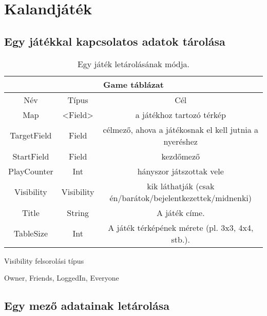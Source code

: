 \section{Kalandjáték}

\subsection{Egy játékkal kapcsolatos adatok tárolása}

\begin{table}[H]
	\centering
	\begin{tabular}{ |c|c|c| }
		\hline
		\multicolumn{3}{|c|}{Game táblázat}\\
		\hline
		Név & Típus & Cél \\
		\hline
		Map  & <Field>  & a játékhoz tartozó térkép  \\
		\hline
		TargetField & Field & célmező, ahova a játékosnak el kell jutnia a nyeréshez\\
		\hline
		StartField & Field & kezdőmező\\
		\hline
		PlayCounter & Int & hányszor játszottak vele\\
		\hline
		Visibility & Visibility & kik láthatják \newline (csak én/barátok/bejelentkezettek/midnenki)\\
		\hline
		Title & String & A játék címe. \\
		\hline
		TableSize & Int & A játék térképének mérete (pl. 3x3, 4x4, stb.).\\
		\hline
	\end{tabular}
	\caption[Game adatbázistábla felépítése]{Egy játék letárolásának módja.}
	\label{tab:game}
\end{table}

Visibility felsorolási típus
\begin{compactitem}
	\item Owner, Friends, LoggedIn, Everyone
\end{compactitem}

\subsection{Egy mező adatainak letárolása}

